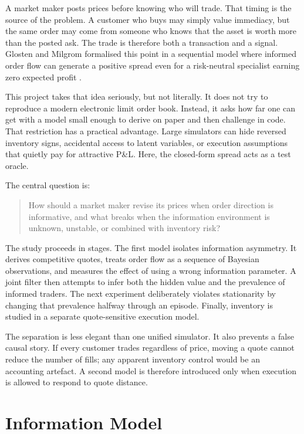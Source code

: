 \documentclass[11pt]{article}
\begin{document}
A market maker posts prices before knowing who will trade. That timing is the source of the problem. A customer who buys may simply value immediacy, but the same order may come from someone who knows that the asset is worth more than the posted ask. The trade is therefore both a transaction and a signal. Glosten and Milgrom formalised this point in a sequential model where informed order flow can generate a positive spread even for a risk-neutral specialist earning zero expected profit \cite{glosten_milgrom_1985}.

This project takes that idea seriously, but not literally. It does not try to reproduce a modern electronic limit order book. Instead, it asks how far one can get with a model small enough to derive on paper and then challenge in code. That restriction has a practical advantage. Large simulators can hide reversed inventory signs, accidental access to latent variables, or execution assumptions that quietly pay for attractive P\&L. Here, the closed-form spread acts as a test oracle.

The central question is:

\begin{quote}
How should a market maker revise its prices when order direction is informative, and what breaks when the information environment is unknown, unstable, or combined with inventory risk?
\end{quote}

The study proceeds in stages. The first model isolates information asymmetry. It derives competitive quotes, treats order flow as a sequence of Bayesian observations, and measures the effect of using a wrong information parameter. A joint filter then attempts to infer both the hidden value and the prevalence of informed traders. The next experiment deliberately violates stationarity by changing that prevalence halfway through an episode. Finally, inventory is studied in a separate quote-sensitive execution model.

The separation is less elegant than one unified simulator. It also prevents a false causal story. If every customer trades regardless of price, moving a quote cannot reduce the number of fills; any apparent inventory control would be an accounting artefact. A second model is therefore introduced only when execution is allowed to respond to quote distance.

\section{Information Model}
\end{document}
